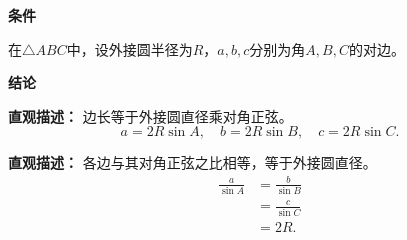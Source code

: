 \begin{statementbox}
	\textbf{\textcolor{CStatement}{条件}}
	\begin{description}[style=nextline, leftmargin=2.8em, labelsep=0.5em, itemsep=0.35em]
		\item[\textbf{\textcolor{CStatement}{条件1（任意三角形）：}}] 在$\triangle ABC$中，设外接圆半径为$R$，$a,b,c$分别为角$A,B,C$的对边。
	\end{description}
	\textbf{\textcolor{CStatement}{结论}}
	\begin{description}[style=nextline, leftmargin=2.8em, labelsep=0.5em, itemsep=0.45em]
		\item[\textbf{\textcolor{CStatement}{结论一（边角关系）：}}]
			\textbf{\textcolor{CStatement}{直观描述：}}
			边长等于外接圆直径乘对角正弦。
			\[
				a = 2R\sin A,\quad b = 2R\sin B,\quad c = 2R\sin C.
			\]
		\item[\textbf{\textcolor{CStatement}{推广结论（比例形式）：}}]
			\textbf{\textcolor{CStatement}{直观描述：}}
			各边与其对角正弦之比相等，等于外接圆直径。
			\[
				\begin{aligned}
					\frac{a}{\sin A} &= \frac{b}{\sin B} \\
					&= \frac{c}{\sin C} \\
					&= 2R.
			\end{aligned}
			\]
	\end{description}
\end{statementbox}
